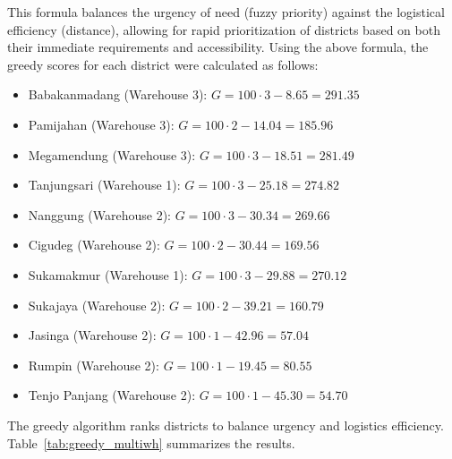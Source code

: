 \documentclass[journal,final,a4paper,twoside,11pt]{IEEEtran}
\begin{document}
This formula balances the urgency of need (fuzzy priority) against the logistical efficiency (distance), allowing for rapid prioritization of districts based on both their immediate requirements and accessibility.
Using the above formula, the greedy scores for each district were calculated as follows:

\begin{itemize}
    \item Babakanmadang (Warehouse 3): \( G = 100 \cdot 3 - 8.65 = 291.35 \)
    \item Pamijahan (Warehouse 3): \( G = 100 \cdot 2 - 14.04 = 185.96 \)
    \item Megamendung (Warehouse 3): \( G = 100 \cdot 3 - 18.51 = 281.49 \)
    \item Tanjungsari (Warehouse 1): \( G = 100 \cdot 3 - 25.18 = 274.82 \)
    \item Nanggung (Warehouse 2): \( G = 100 \cdot 3 - 30.34 = 269.66 \)
    \item Cigudeg (Warehouse 2): \( G = 100 \cdot 2 - 30.44 = 169.56 \)
    \item Sukamakmur (Warehouse 1): \( G = 100 \cdot 3 - 29.88 = 270.12 \)
    \item Sukajaya (Warehouse 2): \( G = 100 \cdot 2 - 39.21 = 160.79 \)
    \item Jasinga (Warehouse 2): \( G = 100 \cdot 1 - 42.96 = 57.04 \)
    \item Rumpin (Warehouse 2): \( G = 100 \cdot 1 - 19.45 = 80.55 \)
    \item Tenjo Panjang (Warehouse 2): \( G = 100 \cdot 1 - 45.30 = 54.70 \)
\end{itemize}


The greedy algorithm ranks districts to balance urgency and logistics efficiency. Table~\ref{tab:greedy_multiwh} summarizes the results.
\end{document}
